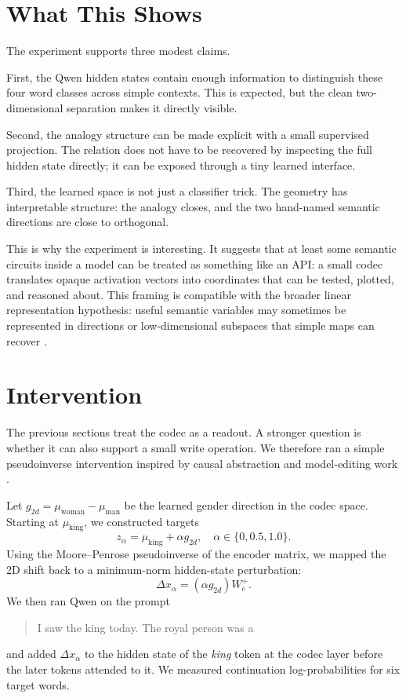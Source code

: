 \documentclass[11pt]{article}
\begin{document}
\section{What This Shows}

The experiment supports three modest claims.

First, the Qwen hidden states contain enough information to distinguish these
four word classes across simple contexts. This is expected, but the clean
two-dimensional separation makes it directly visible.

Second, the analogy structure can be made explicit with a small supervised
projection. The relation does not have to be recovered by inspecting the full
hidden state directly; it can be exposed through a tiny learned interface.

Third, the learned space is not just a classifier trick. The geometry has
interpretable structure: the analogy closes, and the two hand-named semantic
directions are close to orthogonal.

This is why the experiment is interesting. It suggests that at least some
semantic circuits inside a model can be treated as something like an API: a
small codec translates opaque activation vectors into coordinates that can be
tested, plotted, and reasoned about. This framing is compatible with the broader
linear representation hypothesis: useful semantic variables may sometimes be
represented in directions or low-dimensional subspaces that simple maps can
recover \cite{park2023}.

\section{Intervention}

The previous sections treat the codec as a readout. A stronger question is
whether it can also support a small write operation. We therefore ran a simple
pseudoinverse intervention inspired by causal abstraction and model-editing
work \cite{geiger2021, meng2022, nanda2023}.

Let \(g_{2d} = \mu_{\mathrm{woman}} - \mu_{\mathrm{man}}\) be the learned
gender direction in the codec space. Starting at \(\mu_{\mathrm{king}}\), we
constructed targets
\[
  z_{\alpha} = \mu_{\mathrm{king}} + \alpha g_{2d},
  \quad \alpha \in \{0, 0.5, 1.0\}.
\]
Using the Moore--Penrose pseudoinverse of the encoder matrix, we mapped the 2D
shift back to a minimum-norm hidden-state perturbation:
\[
  \Delta x_{\alpha} = (\alpha g_{2d}) W_e^{+}.
\]
We then ran Qwen on the prompt
\begin{quote}
I saw the king today. The royal person was a
\end{quote}
and added \(\Delta x_{\alpha}\) to the hidden state of the \emph{king} token at
the codec layer before the later tokens attended to it. We measured continuation
log-probabilities for six target words.
\end{document}
